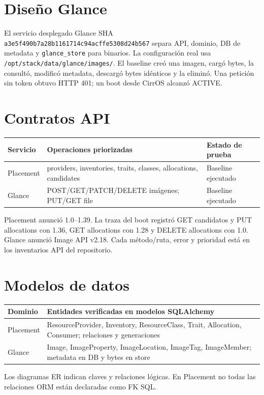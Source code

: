 \documentclass[10pt,a4paper]{article}
\begin{document}
\section{Diseño Glance}
El servicio desplegado Glance SHA \texttt{a3e5f490b7a28b1161714c94acffe5308d24b567} separa API, dominio, DB de metadata y \texttt{glance\_store} para binarios. La configuración real usa \texttt{/opt/stack/data/glance/images/}. El baseline creó una imagen, cargó bytes, la consultó, modificó metadata, descargó bytes idénticos y la eliminó. Una petición sin token obtuvo HTTP 401; un boot desde CirrOS alcanzó ACTIVE.

\section{Contratos API}
\begin{center}\begin{tabular}{p{2.6cm}p{7.0cm}p{3.0cm}}\toprule
Servicio & Operaciones priorizadas & Estado de prueba\\\midrule
Placement & providers, inventories, traits, classes, allocations, candidates & Baseline ejecutado\\
Glance & POST/GET/PATCH/DELETE imágenes; PUT/GET file & Baseline ejecutado\\\bottomrule
\end{tabular}\end{center}
Placement anunció 1.0--1.39. La traza del boot registró GET candidatos y PUT allocations con 1.36, GET allocations con 1.28 y DELETE allocations con 1.0. Glance anunció Image API v2.18. Cada método/ruta, error y prioridad está en los inventarios API del repositorio.

\section{Modelos de datos}
\begin{center}\begin{tabular}{p{3.1cm}p{9.4cm}}\toprule
Dominio & Entidades verificadas en modelos SQLAlchemy\\\midrule
Placement & ResourceProvider, Inventory, ResourceClass, Trait, Allocation, Consumer; relaciones y generaciones\\
Glance & Image, ImageProperty, ImageLocation, ImageTag, ImageMember; metadata en DB y bytes en store\\\bottomrule
\end{tabular}\end{center}
Los diagramas ER indican claves y relaciones lógicas. En Placement no todas las relaciones ORM están declaradas como FK SQL.
\end{document}
